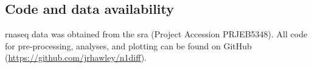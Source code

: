 \subsection{Code and data availability}

\Gls{rnaseq} data was obtained from the \gls{sra} \cite{leinonenSequenceReadArchive2011} (Project Accession PRJEB5348).
All code for pre-processing, analyses, and plotting can be found on GitHub (\url{https://github.com/jrhawley/n1diff}).

